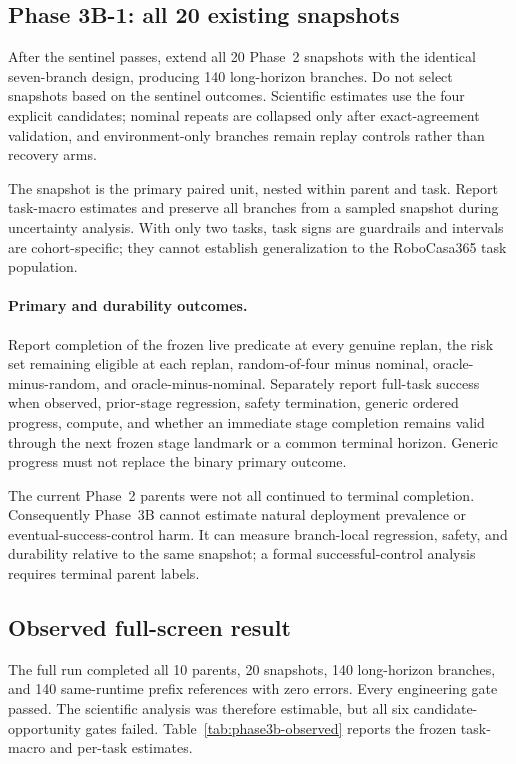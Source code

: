 \subsection{Phase 3B-1: all 20 existing snapshots}

After the sentinel passes, extend all 20 Phase~2 snapshots with the identical seven-branch design, producing 140 long-horizon branches. Do not select snapshots based on the sentinel outcomes. Scientific estimates use the four explicit candidates; nominal repeats are collapsed only after exact-agreement validation, and environment-only branches remain replay controls rather than recovery arms.

The snapshot is the primary paired unit, nested within parent and task. Report task-macro estimates and preserve all branches from a sampled snapshot during uncertainty analysis. With only two tasks, task signs are guardrails and intervals are cohort-specific; they cannot establish generalization to the RoboCasa365 task population.

\paragraph{Primary and durability outcomes.}
Report completion of the frozen live predicate at every genuine replan, the risk set remaining eligible at each replan, random-of-four minus nominal, oracle-minus-random, and oracle-minus-nominal. Separately report full-task success when observed, prior-stage regression, safety termination, generic ordered progress, compute, and whether an immediate stage completion remains valid through the next frozen stage landmark or a common terminal horizon. Generic progress must not replace the binary primary outcome.

The current Phase~2 parents were not all continued to terminal completion. Consequently Phase~3B cannot estimate natural deployment prevalence or eventual-success-control harm. It can measure branch-local regression, safety, and durability relative to the same snapshot; a formal successful-control analysis requires terminal parent labels.

\subsection{Observed full-screen result}

The full run completed all 10 parents, 20 snapshots, 140 long-horizon branches, and 140 same-runtime prefix references with zero errors. Every engineering gate passed. The scientific analysis was therefore estimable, but all six candidate-opportunity gates failed. Table~\ref{tab:phase3b-observed} reports the frozen task-macro and per-task estimates.

